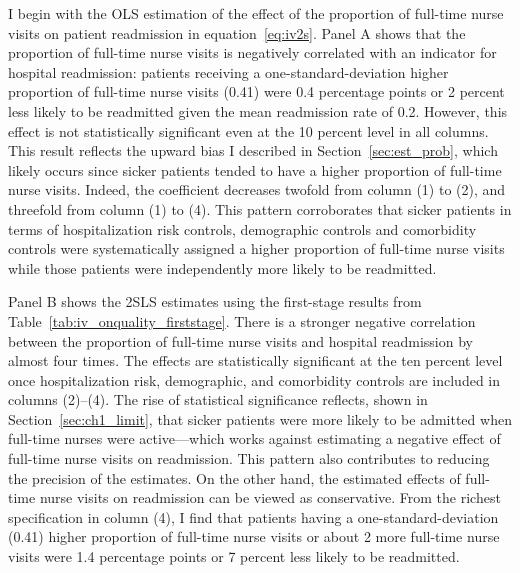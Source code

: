 \documentclass[final,12pt]{article}
\begin{document}
I begin with the OLS estimation of the effect of the proportion of full-time nurse visits on patient readmission in equation~\eqref{eq:iv2s}.
Panel A shows that the proportion of full-time nurse visits is negatively correlated with an indicator for hospital readmission: patients receiving a one-standard-deviation higher proportion of full-time nurse visits (0.41) were 0.4 percentage points or 2 percent less likely to be readmitted given the mean readmission rate of 0.2.
However, this effect is not statistically significant even at the 10 percent level in all columns.
This result reflects the upward bias I described in Section~\ref{sec:est_prob}, which likely occurs since sicker patients tended to have a higher proportion of full-time nurse visits.
Indeed, the coefficient decreases twofold from column (1) to (2), and threefold from column (1) to (4). This pattern corroborates that sicker patients in terms of hospitalization risk controls, demographic controls and comorbidity controls were systematically assigned a higher proportion of full-time nurse visits while those patients were independently more likely to be readmitted.

Panel B shows the 2SLS estimates using the first-stage results from Table~\ref{tab:iv_onquality_firststage}.
There is a stronger negative correlation between the proportion of full-time nurse visits and hospital readmission by almost four times.
The effects are statistically significant at the ten percent level once hospitalization risk, demographic, and comorbidity controls are included in columns (2)--(4).
The rise of statistical significance reflects, shown in Section~\ref{sec:ch1_limit}, that sicker patients were more likely to be admitted when full-time nurses were active---which works against estimating a negative effect of full-time nurse visits on readmission.
This pattern also contributes to reducing the precision of the estimates.
On the other hand, the estimated effects of full-time nurse visits on readmission can be viewed as conservative.
From the richest specification in column (4), I find that patients having a one-standard-deviation (0.41) higher proportion of full-time nurse visits or about 2 more full-time nurse visits were 1.4 percentage points or 7 percent less likely to be readmitted.
\end{document}
